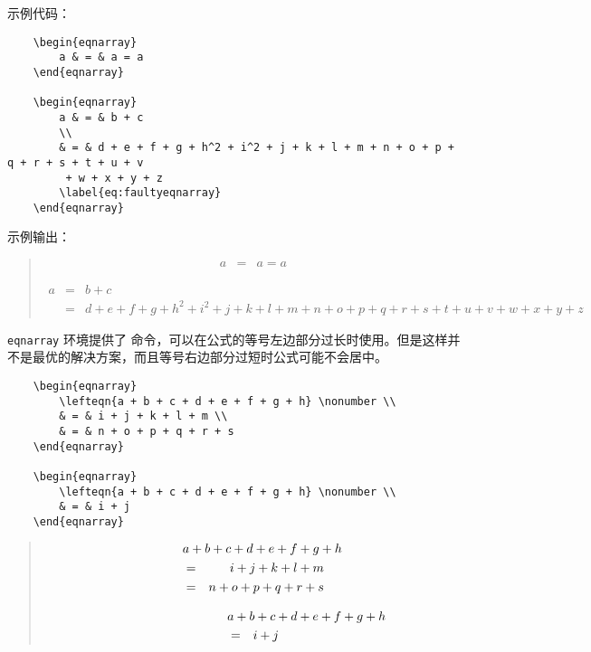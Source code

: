 \documentclass[UTF8]{ctexart}
\begin{document}
示例代码：
\begin{verbatim}
    \begin{eqnarray}
        a & = & a = a
    \end{eqnarray}

    \begin{eqnarray}
        a & = & b + c
        \\
        & = & d + e + f + g + h^2 + i^2 + j + k + l + m + n + o + p + q + r + s + t + u + v
         + w + x + y + z
        \label{eq:faultyeqnarray}
    \end{eqnarray}
\end{verbatim}

示例输出：
\begin{quote}
    \begin{eqnarray}
        a & = & a = a
    \end{eqnarray}

    \begin{eqnarray}
        a & = & b + c
        \\
        & = & d + e + f + g + h^2 + i^2 + j + k + l + m + n + o + p + q + r + s + t + u + v
         + w + x + y + z
        \label{eq:faultyeqnarray}
    \end{eqnarray}
\end{quote}

\texttt{eqnarray} 环境提供了 \texttt{\lefteqn} 命令，可以在公式的等号左边部分过长时使用。但是这样并
不是最优的解决方案，而且等号右边部分过短时公式可能不会居中。

\begin{verbatim}
    \begin{eqnarray}
        \lefteqn{a + b + c + d + e + f + g + h} \nonumber \\
        & = & i + j + k + l + m \\
        & = & n + o + p + q + r + s
    \end{eqnarray}

    \begin{eqnarray}
        \lefteqn{a + b + c + d + e + f + g + h} \nonumber \\
        & = & i + j
    \end{eqnarray}
\end{verbatim}

\begin{quote}
    \begin{eqnarray}
        \lefteqn{a + b + c + d + e + f + g + h} \nonumber \\
        & = & i + j + k + l + m \\
        & = & n + o + p + q + r + s
    \end{eqnarray}

    \begin{eqnarray}
        \lefteqn{a + b + c + d + e + f + g + h} \nonumber \\
        & = & i + j
    \end{eqnarray}
\end{quote}
\end{document}
